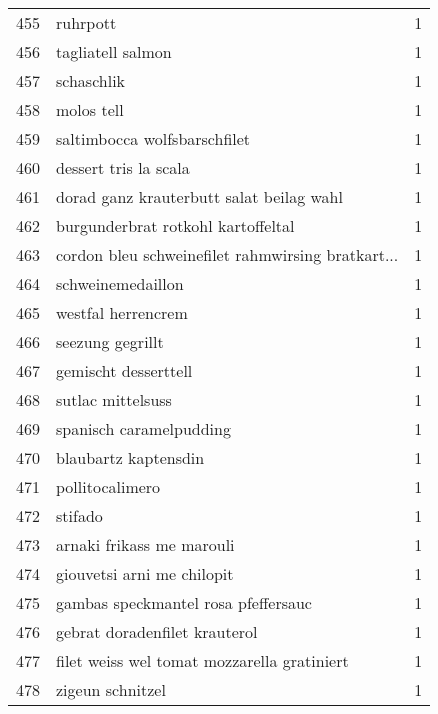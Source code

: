 \begin{tabular}{llr}
455 &                                           ruhrpott &      1 \\
456 &                                  tagliatell salmon &      1 \\
457 &                                         schaschlik &      1 \\
458 &                                         molos tell &      1 \\
459 &                       saltimbocca wolfsbarschfilet &      1 \\
460 &                              dessert tris la scala &      1 \\
461 &           dorad ganz krauterbutt salat beilag wahl &      1 \\
462 &                 burgunderbrat rotkohl kartoffeltal &      1 \\
463 &  cordon bleu schweinefilet rahmwirsing bratkart... &      1 \\
464 &                                  schweinemedaillon &      1 \\
465 &                                 westfal herrencrem &      1 \\
466 &                                   seezung gegrillt &      1 \\
467 &                               gemischt desserttell &      1 \\
468 &                                  sutlac mittelsuss &      1 \\
469 &                            spanisch caramelpudding &      1 \\
470 &                               blaubartz kaptensdin &      1 \\
471 &                                    pollitocalimero &      1 \\
472 &                                            stifado &      1 \\
473 &                          arnaki frikass me marouli &      1 \\
474 &                         giouvetsi arni me chilopit &      1 \\
475 &                gambas speckmantel rosa pfeffersauc &      1 \\
476 &                      gebrat doradenfilet krauterol &      1 \\
477 &        filet weiss wel tomat mozzarella gratiniert &      1 \\
478 &                                   zigeun schnitzel &      1 \\

\end{tabular}
